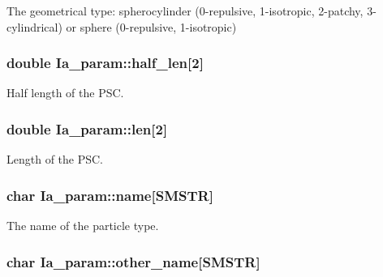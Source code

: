 The geometrical type\+: spherocylinder (0-\/repulsive, 1-\/isotropic, 2-\/patchy, 3-\/cylindrical) or sphere (0-\/repulsive, 1-\/isotropic) 

\hypertarget{class_ia__param_a2cccc1246cdc72d8b88a747efdfd4f70}{
\subsubsection[{half\+\_\+len}]{\setlength{\rightskip}{0pt plus 5cm}double Ia\+\_\+param\+::half\+\_\+len\mbox{[}2\mbox{]}}}\label{class_ia__param_a2cccc1246cdc72d8b88a747efdfd4f70}


Half length of the P\+S\+C. 

\hypertarget{class_ia__param_a50f385d02c6d6c4dabec2c27f552b358}{
\subsubsection[{len}]{\setlength{\rightskip}{0pt plus 5cm}double Ia\+\_\+param\+::len\mbox{[}2\mbox{]}}}\label{class_ia__param_a50f385d02c6d6c4dabec2c27f552b358}


Length of the P\+S\+C. 

\hypertarget{class_ia__param_a93db89588de0ca8555f7b312424161db}{
\subsubsection[{name}]{\setlength{\rightskip}{0pt plus 5cm}char Ia\+\_\+param\+::name\mbox{[}{\bf S\+M\+S\+T\+R}\mbox{]}}}\label{class_ia__param_a93db89588de0ca8555f7b312424161db}


The name of the particle type. 

\hypertarget{class_ia__param_afd6e54f0e156fdbcb2c3a7a21867c147}{
\subsubsection[{other\+\_\+name}]{\setlength{\rightskip}{0pt plus 5cm}char Ia\+\_\+param\+::other\+\_\+name\mbox{[}{\bf S\+M\+S\+T\+R}\mbox{]}}}\label{class_ia__param_afd6e54f0e156fdbcb2c3a7a21867c147}


